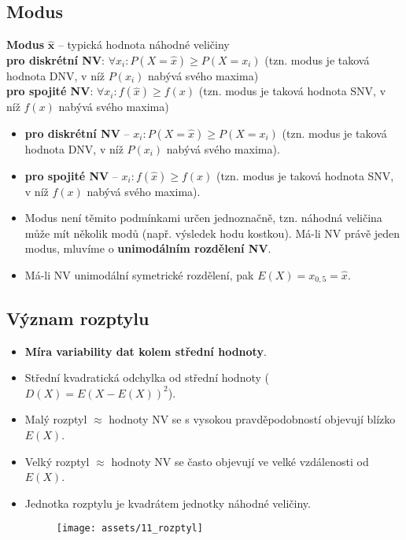 \subsection{Modus}
\textbf{Modus} $\mathbf{\hat{x}}$ -- typická hodnota náhodné veličiny \\
\textbf{pro diskrétní NV}: $\forall x_i: P(X = \hat{x}) \geq P(X = x_i)$ (tzn. modus je taková hodnota DNV, v níž $P(x_i)$ nabývá svého maxima) \\
\textbf{pro spojité NV}: $\forall  x_i: f(\hat{x}) \geq f(x)$ (tzn. modus je taková hodnota SNV, v níž $f(x)$ nabývá svého maxima)
\begin{itemize}
    \item \textbf{pro diskrétní NV} -- $x_i: P(X = \hat{x}) \geq P(X = x_i)$ (tzn. modus je taková hodnota DNV, v níž $P(x_i)$ nabývá svého maxima).
    \item \textbf{pro spojité NV} -- $ x_i: f(\hat{x}) \geq f(x)$ (tzn. modus je taková hodnota SNV, v níž $f(x)$ nabývá svého maxima).
    \item Modus není těmito podmínkami určen jednoznačně, tzn. náhodná veličina může mít několik modů (např. výsledek hodu kostkou). Má-li NV právě jeden modus, mluvíme o \textbf{unimodálním rozdělení NV}.
    \item Má-li NV unimodální symetrické rozdělení, pak $E(X) = x_{0,5} = \hat{x}$.
\end{itemize}

\subsection{Význam rozptylu}
\begin{itemize}
    \item \textbf{Míra variability dat kolem střední hodnoty}.
    \item Střední kvadratická odchylka od střední hodnoty ($D(X) = E(X - E(X))^2$).
    \item Malý rozptyl $\approx$ hodnoty NV se s vysokou pravděpodobností objevují blízko $E(X)$.
    \item Velký rozptyl $\approx$ hodnoty NV se často objevují ve velké vzdálenosti od $E(X)$.
    \item Jednotka rozptylu je kvadrátem jednotky náhodné veličiny.
          \begin{figure}[H]
              \centering
              \texttt{[image: assets/11\_rozptyl]}
          \end{figure}
\end{itemize}

